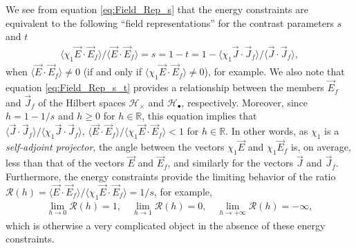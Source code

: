 \documentclass{cmslatex}
\begin{document}
 We see from equation \eqref{eq:Field_Rep_s} that the energy
 constraints are equivalent to the following ``field representations''
 for the contrast parameters $s$ and $t$
%
\begin{align}\label{eq:Field_Rep_s_t}
  \langle\chi_1\vec{E}\cdot\vec{E}_f\rangle/\langle\vec{E}\cdot\vec{E}_f\rangle
  =s=1-t
  =1- \langle\chi_1\vec{J}\cdot\vec{J}_f\rangle/\langle\vec{J}\cdot\vec{J}_f\rangle,
\end{align}
%
when $\langle\vec{E}\cdot\vec{E}_f\rangle\neq0$ (if and only if
$\langle\chi_1\vec{E}\cdot\vec{E}_f\rangle\neq0$), for example. We also note that equation 
\eqref{eq:Field_Rep_s_t} provides a relationship between the
members $\vec{E}_f$ and $\vec{J}_f$ of the Hilbert spaces
$\mathscr{H}_\times$ and $\mathscr{H}_{\bullet}$, respectively. Moreover, since
$h=1-1/s$ and $h\geq0$ for $h\in\mathbb{R}$, this equation implies
that $\langle\vec{J}\cdot\vec{J}_f\rangle/\langle\chi_1\vec{J}\cdot\vec{J}_f\rangle,\,
\langle\vec{E}\cdot\vec{E}_f\rangle/\langle\chi_1\vec{E}\cdot\vec{E}_f\rangle<1$ for 
$h\in\mathbb{R}$. In other words, as $\chi_1$ is a \emph{self-adjoint
  projector}, the angle between the vectors $\chi_1\vec{E}$ and
$\chi_1\vec{E}_f$ is, on average, less than that of the vectors
$\vec{E}$ and $\vec{E}_f$, and similarly for the vectors $\vec{J}$ and
$\vec{J}_f$. Furthermore, the energy constraints provide the limiting
behavior of the ratio
$\mathcal{R}(h)=\langle\vec{E}\cdot\vec{E}_f\rangle/\langle\chi_1\vec{E}\cdot\vec{E}_f\rangle=1/s$, for
example,    
%
\begin{align*}
  \lim_{h\to0}\mathcal{R}(h)=1, \quad
  \lim_{h\to1}\mathcal{R}(h)=0, \quad
  \lim_{h\to+\infty}\mathcal{R}(h)=-\infty,
\end{align*}
%
which is otherwise a very complicated object in the absence of these
energy constraints.
\end{document}
